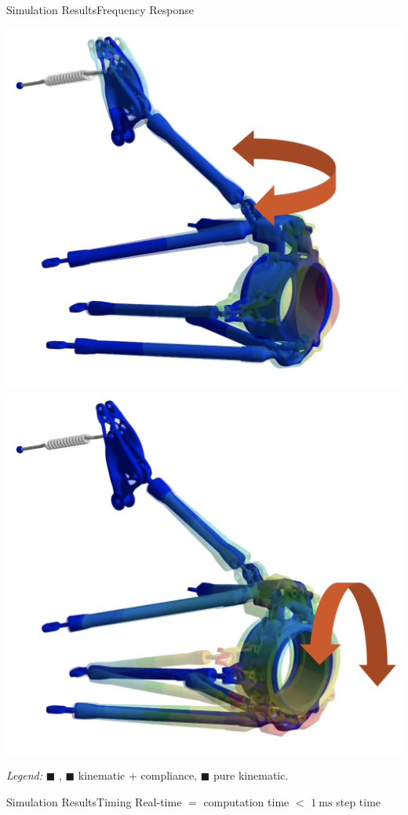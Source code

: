 \begin{frame}{Simulation Results}{Frequency Response}
\begin{minipage}[c]{0.3\linewidth}
    \includegraphics[width=0.5\linewidth]{./figures/mode2.png}  \\
    \includegraphics[width=0.5\linewidth]{./figures/mode3.png}  \\
  \end{minipage}
  \begin{center}
    \emph{Legend:}
    {\color{mycolor1}$\blacksquare$} \Ansys{}, {\color{mycolor2}$\blacksquare$} kinematic + compliance, {\color{mycolor3}$\blacksquare$} pure kinematic.
  \end{center}
\end{frame}

\begin{frame}{Simulation Results}{Timing}
  Real-time $=$ computation time $<$ $\SI{1}{\milli\second}$ step time \\[1.0em]
\end{frame}


